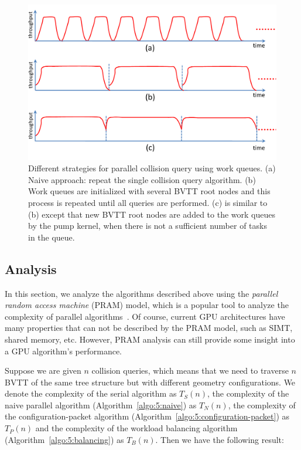\begin{figure}[!htb]
  \centering
  \includegraphics[width=\linewidth]{figs/5/gproximity-parallel-differentcontrol.pdf}
  \caption[Different strategies for parallel collision query using work queues]{Different strategies for parallel collision query using work queues. (a) Naive approach: repeat the single collision query algorithm. (b) Work queues are initialized with several BVTT root nodes and this process is repeated until all queries are performed. (c) is similar to (b) except that new BVTT root nodes are added to the work queues by the pump kernel, when there is not a sufficient number of tasks in the queue.}
  \label{fig:5:gproximity-control}
\end{figure}


\subsection{Analysis}

In this section, we analyze the algorithms described above using the \emph{parallel random access machine} (PRAM) model, which is a popular tool to analyze the complexity of parallel algorithms~\cite{Joesphbook}. Of course, current GPU architectures have many properties that can not be described by the PRAM model, such as SIMT, shared memory, etc. However, PRAM analysis can still provide some insight into a GPU algorithm's performance.

Suppose we are given $n$ collision queries, which means that we need to traverse $n$ BVTT of the same tree structure but with different geometry configurations. We denote the complexity of the serial algorithm as $T_S(n)$, the complexity of the naive parallel algorithm (Algorithm~\ref{algo:5:naive}) as $T_N(n)$, the complexity of the configuration-packet algorithm (Algorithm~\ref{algo:5:configuration-packet}) as $T_P(n)$ and the complexity of the workload balancing algorithm (Algorithm~\ref{algo:5:balancing}) as $T_B(n)$. Then we have the following result:

